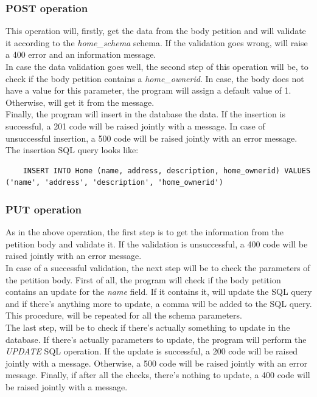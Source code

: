 \documentclass[a4paper,12pt]{article}
\begin{document}
\subsubsection*{POST operation}
This operation will, firstly, get the data from the body petition and will validate it according to the \textit{home\_schema} schema. If the validation goes wrong, will raise a 400 error and an information message.\\
In case the data validation goes well, the second step of this operation will be, to check if the body petition contains a \textit{home\_ownerid}. In case, the body does not have a value for this parameter, the program will assign a default value of 1. Otherwise, will get it from the message.\\
Finally, the program will insert in the database the data. If the insertion is successful, a 201 code will be raised jointly with a message. In case of unsuccessful insertion, a 500 code will be raised jointly with an error message.\\
The insertion SQL query looks like:
\begin{lstlisting}
    INSERT INTO Home (name, address, description, home_ownerid) VALUES ('name', 'address', 'description', 'home_ownerid')
\end{lstlisting}
\subsubsection*{PUT operation}
As in the above operation, the first step is to get the information from the petition body and validate it. If the validation is unsuccessful, a 400 code will be raised jointly with an error message.\\
In case of a successful validation, the next step will be to check the parameters of the petition body. First of all, the program will check if the body petition contains an update for the \textit{name} field. If it contains it, will update the SQL query and if there's anything more to update, a comma will be added to the SQL query. This procedure, will be repeated for all the schema parameters.\\
The last step, will be to check if there's actually something to update in the database. If there's actually parameters to update, the program will perform the \textit{UPDATE} SQL operation. If the update is successful, a 200 code will be raised jointly with a message. Otherwise, a 500 code will be raised jointly with an error message.
Finally, if after all the checks, there's nothing to update, a 400 code will be raised jointly with a message.
\end{document}
